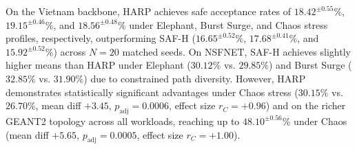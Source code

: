 \documentclass[final,5p]{elsarticle}
\newcommand{\rev}[1]{\textcolor{BrickRed}{#1}}
\begin{document}
\begin{table}[!tb]
\centering
\caption{\rev{Stress-simulation safe acceptance across topologies and workloads (\%; mean$^{\pm SD}$). Each result summarizes 20 matched-seed runs.}}
\label{tab:simulation_acceptance_summary}
\renewcommand{\arraystretch}{1.15}
\small
{}
\end{table}

\rev{On the Vietnam backbone, HARP achieves safe acceptance rates of $18.42^{\pm0.55}\%$, $19.15^{\pm0.46}\%$, and $18.56^{\pm0.48}\%$ under Elephant, Burst Surge, and Chaos stress profiles, respectively, outperforming SAF-H ($16.65^{\pm0.52}\%$, $17.68^{\pm0.41}\%$, and $15.92^{\pm0.52}\%$) across $N=20$ matched seeds. On NSFNET, SAF-H achieves slightly higher means than HARP under Elephant ($30.12\%$ vs. $29.85\%$) and Burst Surge ($32.85\%$ vs. $31.90\%$) due to constrained path diversity. However, HARP demonstrates statistically significant advantages under Chaos stress ($30.15\%$ vs. $26.70\%$, mean diff $+3.45$, $p_{\text{adj}} = 0.0006$, effect size $r_C = +0.96$) and on the richer GEANT2 topology across all workloads, reaching up to $48.10^{\pm0.56}\%$ under Chaos (mean diff $+5.65$, $p_{\text{adj}} = 0.0005$, effect size $r_C = +1.00$).}
\end{document}
